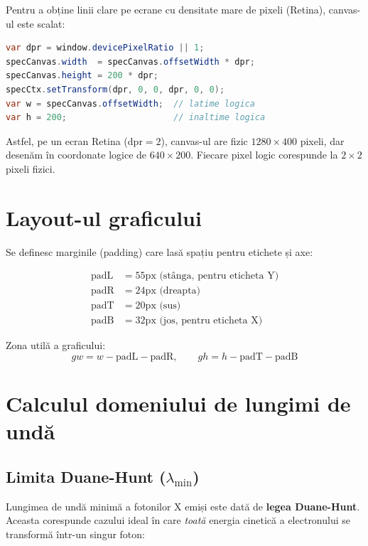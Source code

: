 \documentclass[12pt,a4paper]{article}
\begin{document}
Pentru a obține linii clare pe ecrane cu densitate mare de pixeli (Retina), canvas-ul este scalat:

\begin{lstlisting}[language=Java]
var dpr = window.devicePixelRatio || 1;
specCanvas.width  = specCanvas.offsetWidth * dpr;
specCanvas.height = 200 * dpr;
specCtx.setTransform(dpr, 0, 0, dpr, 0, 0);
var w = specCanvas.offsetWidth;  // latime logica
var h = 200;                     // inaltime logica
\end{lstlisting}

Astfel, pe un ecran Retina ($\text{dpr} = 2$), canvas-ul are fizic $1280 \times 400$ pixeli, dar desenăm în coordonate logice de $640 \times 200$. Fiecare pixel logic corespunde la $2 \times 2$ pixeli fizici.


\section{Layout-ul graficului}

Se definesc marginile (padding) care lasă spațiu pentru etichete și axe:

\begin{align*}
    \text{padL} &= 55\text{px (stânga, pentru eticheta Y)} \\
    \text{padR} &= 24\text{px (dreapta)} \\
    \text{padT} &= 20\text{px (sus)} \\
    \text{padB} &= 32\text{px (jos, pentru eticheta X)}
\end{align*}

Zona utilă a graficului:
\[
    gw = w - \text{padL} - \text{padR}, \qquad gh = h - \text{padT} - \text{padB}
\]


\section{Calculul domeniului de lungimi de undă}

\subsection{Limita Duane-Hunt ($\lambda_{\min}$)}

Lungimea de undă minimă a fotonilor X emiși este dată de \textbf{legea Duane-Hunt}. Aceasta corespunde cazului ideal în care \emph{toată} energia cinetică a electronului se transformă într-un singur foton:
\end{document}
